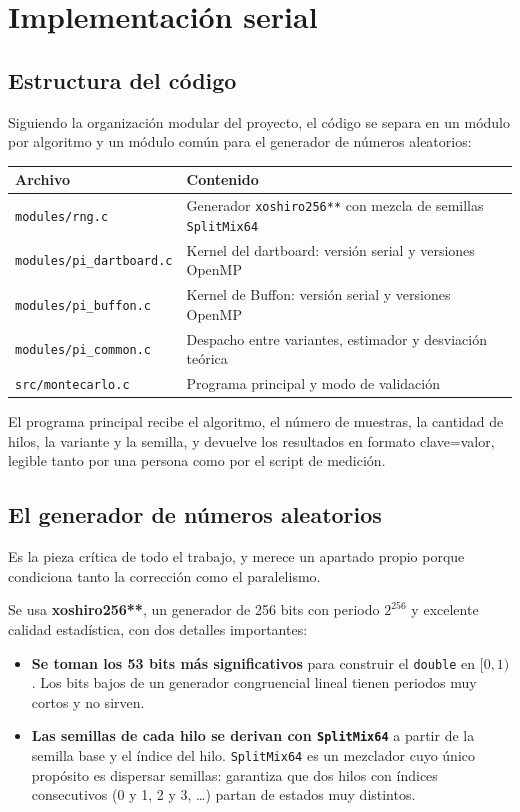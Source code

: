 \section{Implementación serial}

\subsection{Estructura del código}

Siguiendo la organización modular del proyecto, el código se separa en un módulo por algoritmo y un módulo común para el generador de números aleatorios:

\begin{center}
\begin{tabular}{|l|p{8.5cm}|}
\hline
\textbf{Archivo} & \textbf{Contenido} \\
\hline
\texttt{modules/rng.c} & Generador \texttt{xoshiro256**} con mezcla de semillas \texttt{SplitMix64} \\
\texttt{modules/pi\_dartboard.c} & Kernel del dartboard: versión serial y versiones OpenMP \\
\texttt{modules/pi\_buffon.c} & Kernel de Buffon: versión serial y versiones OpenMP \\
\texttt{modules/pi\_common.c} & Despacho entre variantes, estimador y desviación teórica \\
\texttt{src/montecarlo.c} & Programa principal y modo de validación \\
\hline
\end{tabular}
\end{center}

El programa principal recibe el algoritmo, el número de muestras, la cantidad de hilos, la variante y la semilla, y devuelve los resultados en formato clave=valor, legible tanto por una persona como por el script de medición.

\subsection{El generador de números aleatorios}

Es la pieza crítica de todo el trabajo, y merece un apartado propio porque condiciona tanto la corrección como el paralelismo.

Se usa \textbf{xoshiro256**}, un generador de 256 bits con periodo $2^{256}$ y excelente calidad estadística, con dos detalles importantes:

\begin{itemize}
    \item \textbf{Se toman los 53 bits más significativos} para construir el \texttt{double} en $[0,1)$. Los bits bajos de un generador congruencial lineal tienen periodos muy cortos y no sirven.
    \item \textbf{Las semillas de cada hilo se derivan con \texttt{SplitMix64}} a partir de la semilla base y el índice del hilo. \texttt{SplitMix64} es un mezclador cuyo único propósito es dispersar semillas: garantiza que dos hilos con índices consecutivos (0 y 1, 2 y 3, \ldots) partan de estados muy distintos.
\end{itemize}

